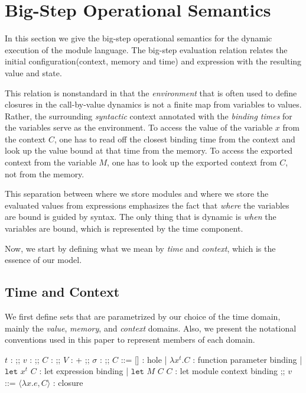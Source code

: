 \documentclass{article}
\theoremstyle{definition}
\newcommand*{\Time}{\mathbb{T}}
\newcommand*{\Ctx}[1]{\text{Ctx}\:{#1}}
\newcommand*{\Value}[1]{\text{Val}\:{#1}}
\newcommand*{\Mem}[1]{\text{Mem}\:{#1}}
\newcommand*{\fin}[2]{{#1}\xrightarrow{\text{fin}}{#2}}
\newcommand*{\Let}{\mathtt{let}}
\begin{document}
\section{Big-Step Operational Semantics}

In this section we give the big-step operational semantics for the dynamic execution of the module language.
The big-step evaluation relation relates the initial configuration(context, memory and time) and expression with the resulting value and state.

This relation is nonstandard in that the \emph{environment} that is often used to define closures in the call-by-value dynamics is not a finite map from variables to values.
Rather, the surrounding \emph{syntactic} context annotated with the \emph{binding times} for the variables serve as the environment.
To access the value of the variable $x$ from the context $C$, one has to read off the closest binding time from the context and look up the value bound at that time from the memory.
To access the exported context from the variable $M$, one has to look up the exported context from $C$, not from the memory.

This separation between where we store modules and where we store the evaluated values from expressions emphasizes the fact that \emph{where} the variables are bound is guided by syntax.
The only thing that is dynamic is \emph{when} the variables are bound, which is represented by the time component.

Now, we start by defining what we mean by \emph{time} and \emph{context}, which is the essence of our model.

\subsection{Time and Context}

We first define sets that are parametrized by our choice of the time domain, mainly the \emph{value}, \emph{memory}, and \emph{context} domains.
Also, we present the notational conventions used in this paper to represent members of each domain.

\begin{bnfgrammar}
  $t$ : \in \Time
  ;;
  $v$ : \in \Value{\Time}
  ;;
  $C$ : \in \Ctx{\Time}
  ;;
  $V$ : \in \Value{\Time}+\Ctx{\Time}
  ;;
  $\sigma$ : \in \Mem{\Time} \triangleq \fin{\Time}{\Value{\Time}}
  ;;
  $C$ ::= [] : hole
  | $\lambda x^{t}.C$ : function parameter binding
  | $\Let$ $x^{t}$ $C$ : let expression binding
  | $\Let$ $M$ $C$ $C$ : let module context binding
  ;;
  $v$ ::= $\langle \lambda x.e, C \rangle$ : closure
\end{bnfgrammar}
\end{document}
